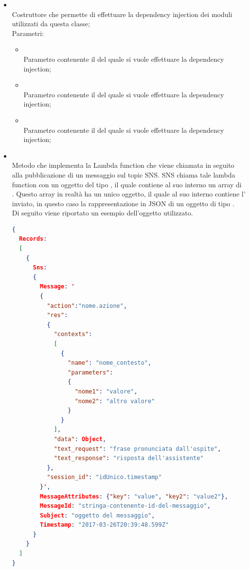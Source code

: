 \begin{itemize}
	\begin{itemize}
		\item[]  \\
		Costruttore che permette di effettuare la dependency injection dei moduli utilizzati da questa classe;\\
		Parametri:
		\begin{itemize}
			\item {} \\
			Parametro contenente il  del quale si vuole effettuare la dependency injection;
			\item {} \\
			Parametro contenente il  del quale si vuole effettuare la dependency injection;
			\item {} \\
			Parametro contenente il  del quale si vuole effettuare la dependency injection;
		\end{itemize}
		\item[]  \\
		Metodo che implementa la Lambda function che viene chiamata in seguito alla pubblicazione di un messaggio sul topic SNS. SNS chiama tale lambda function con un oggetto del tipo , il quale contiene al suo interno un array di . Questo array in realtà ha un unico oggetto, il quale al suo interno contiene l' inviato, in questo caso la rappresentazione in JSON di un oggetto di tipo . \\
Di seguito viene riportato un esempio dell'oggetto utilizzato.
\begin{lstlisting}[language=json,firstnumber=1]
{
  Records:
  [
    {
      Sns:
      {
        Message: '
        {
          "action":"nome.azione",
          "res":
          {
            "contexts":
            [
              {
                "name": "nome_contesto",
                "parameters":
                {
                  "nome1": "valore",
                  "nome2": "altro valore"
                }
              }
            ],
            "data": Object,
            "text_request": "frase pronunciata dall'ospite",
            "text_response": "risposta dell'assistente"
          },
          "session_id": "idUnico.timestamp"
        }',
        MessageAttributes: {"key": "value", "key2": "value2"},
        MessageId: "stringa-contenente-id-del-messaggio",
        Subject: "oggetto del messaggio",
        Timestamp: "2017-03-26T20:39:48.599Z"
      }
    }
  ]
}


\end{lstlisting}
\end{itemize}
\end{itemize}
